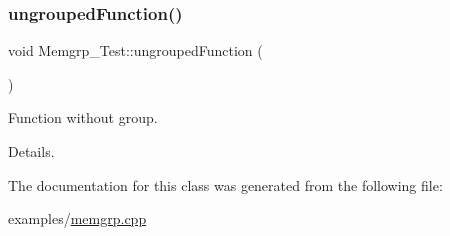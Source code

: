 \subsubsection{\texorpdfstring{ungroupedFunction()}{ungroupedFunction()}}
{\footnotesize\ttfamily void Memgrp\+\_\+\+Test\+::ungrouped\+Function (\begin{DoxyParamCaption}{ }\end{DoxyParamCaption})}



Function without group. 

Details. 

The documentation for this class was generated from the following file\+:\begin{DoxyCompactItemize}
\item 
examples/\mbox{\hyperlink{memgrp_8cpp}{memgrp.\+cpp}}\end{DoxyCompactItemize}
